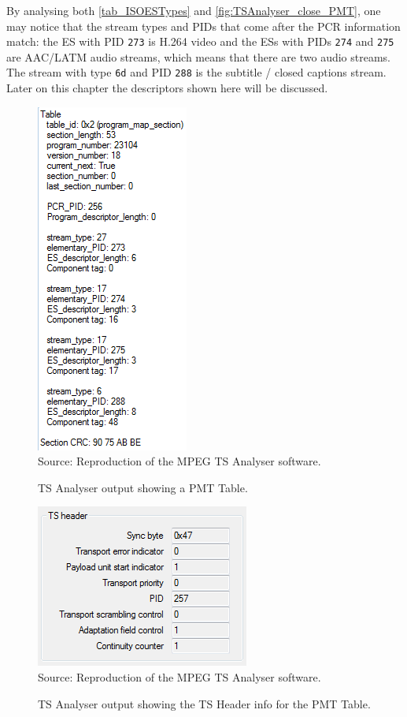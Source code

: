 \documentclass[
	12pt,				%
	openright,			%
	twoside,			%
	a4paper,			%
	brazil,
	french,				%
	english
	]{abntex2}
\begin{document}
\begin{apendicesenv}
By analysing both \autoref{tab_ISOESTypes} and \autoref{fig:TSAnalyser_close_PMT}, one may notice that the stream types and PIDs that come after the PCR information match: the ES with PID \texttt{273} is H.264 video and the ESs with PIDs \texttt{274} and \texttt{275} are AAC/LATM audio streams, which means that there are two audio streams. The stream with type \texttt{6d} and PID \texttt{288} is the subtitle / closed captions stream. Later on this chapter the descriptors shown here will be discussed.

\begin{figure}[!hb]
\centering
\caption{TS Analyser output showing a PMT Table.}
\includegraphics[width=0.4\linewidth]{figuras/TSAnalyser_close_PMT.png}
\\Source: Reproduction of the MPEG TS Analyser software.
\label{fig:TSAnalyser_close_PMT}
\end{figure}

\begin{figure}[!hb]
\centering
\caption{TS Analyser output showing the TS Header info for the PMT Table.}
\includegraphics[width=0.4\linewidth]{figuras/TSAnalyser_close_PMT_TS_Header.png}
\\Source: Reproduction of the MPEG TS Analyser software.
\label{fig:TSAnalyser_close_PMT_TS_Header}
\end{figure}



\end{apendicesenv}
\end{document}
